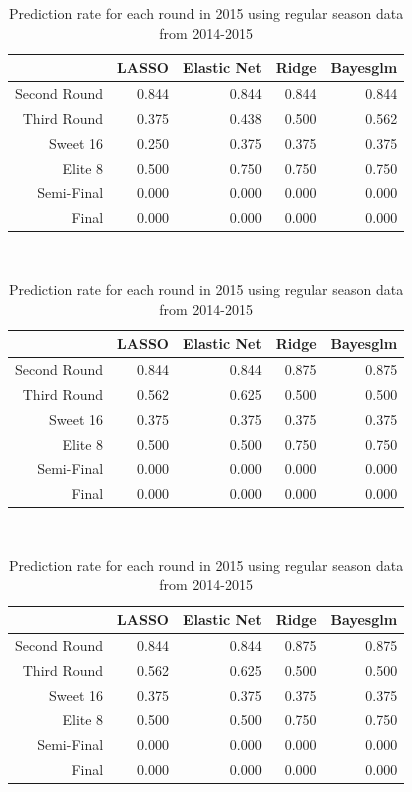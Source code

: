 \documentclass{article} %
\begin{document}
\begin{table}[H]
\centering
{\small
\begin{tabular}{rrrrr}
  \hline
 & LASSO & Elastic Net & Ridge & Bayesglm \\ 
  \hline
Second Round & 0.844 & 0.844 & 0.844 & 0.844 \\ 
  Third Round & 0.375 & 0.438 & 0.500 & 0.562 \\ 
  Sweet 16 & 0.250 & 0.375 & 0.375 & 0.375 \\ 
  Elite 8 & 0.500 & 0.750 & 0.750 & 0.750 \\ 
  Semi-Final & 0.000 & 0.000 & 0.000 & 0.000 \\ 
  Final & 0.000 & 0.000 & 0.000 & 0.000 \\ 
   \hline
\end{tabular}
}
\caption{Prediction rate for each round in 2015 using regular season data from 2013-2015}\

\centering
{\small
\begin{tabular}{rrrrr}
  \hline
 & LASSO & Elastic Net & Ridge & Bayesglm \\ 
  \hline
Second Round & 0.844 & 0.844 & 0.875 & 0.875 \\ 
  Third Round & 0.562 & 0.625 & 0.500 & 0.500 \\ 
  Sweet 16 & 0.375 & 0.375 & 0.375 & 0.375 \\ 
  Elite 8 & 0.500 & 0.500 & 0.750 & 0.750 \\ 
  Semi-Final & 0.000 & 0.000 & 0.000 & 0.000 \\ 
  Final & 0.000 & 0.000 & 0.000 & 0.000 \\ 
   \hline
\end{tabular}
}
\caption{Prediction rate for each round in 2015 using regular season data for 2015}\

\centering
{\small
\begin{tabular}{rrrrr}
  \hline
 & LASSO & Elastic Net & Ridge & Bayesglm \\ 
  \hline
Second Round & 0.844 & 0.844 & 0.875 & 0.875 \\ 
  Third Round & 0.562 & 0.625 & 0.500 & 0.500 \\ 
  Sweet 16 & 0.375 & 0.375 & 0.375 & 0.375 \\ 
  Elite 8 & 0.500 & 0.500 & 0.750 & 0.750 \\ 
  Semi-Final & 0.000 & 0.000 & 0.000 & 0.000 \\ 
  Final & 0.000 & 0.000 & 0.000 & 0.000 \\ 
   \hline
\end{tabular}
}
\caption{Prediction rate for each round in 2015 using regular season data from 2014-2015}\ 


\end{table}
\end{document}

